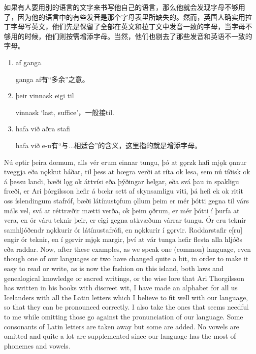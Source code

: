 \begin{translation*}{}
    如果有人要用别的语言的文字来书写他自己的语言，那么他就会发现字母不够用了，因为他的语言中的有些发音是那个字母表里所缺失的。然而，英国人确实用拉丁字母写英文，他们先是保留了全部在英文和拉丁文中发音一致的字母，当字母不够用的时候，他们则按需增添字母。当然，他们也剔去了那些发音和英语不一致的字母。
\end{translation*}
\begin{grammar*}{}
    \begin{enumerate}[leftmargin=*]
        \item af ganga

              ganga af有“多余”之意。

        \item þeir vinnask eigi til

              vinnask `last, suffice'，一般接til.

        \item hafa við aðra stafi

              hafa við e-u有“与...相适合”的含义，这里指的就是增添字母。
    \end{enumerate}
\end{grammar*}
\begin{paracol}{2}
    Nú eptir þeira dœmum, alls vér erum einnar tungu, þó at gǫrzk hafi mjǫk ǫnnur tveggja eða nǫkkut báðar, til þess at hœgra verði at ríta ok lesa, sem nú tíðisk ok á þessu landi, bæði lǫg ok áttvísi eða þýðingar helgar, eða svá þau in spakligu frœði, er Ari þórgilsson hefir á bœkr sett af skynsamligu viti, þá hefi ek ok ritit oss íslendingum stafróf, bæði látínustǫfum ǫllum þeim er mér þótti gegna til várs máls vel, svá at réttræðir mætti verða, ok þeim ǫðrum, er mér þótti í þurfa at vera, en ór váru teknir þeir, er eigi gegna atkvæðum várrar tungu. Ór eru teknir samhljóðendr nǫkkurir ór látínustafrófi, en nǫkkurir í gǫrvir. Raddarstafir e[ru] engir ór teknir, en í gǫrvir mjǫk margir, því at vár tunga hefir flesta alla hljóðs eða raddar.
    \switchcolumn
    Now, after these examples, as we speak one (common) language, even though one of our languages or two have changed quite a bit, in order to make it easy to read or write, as is now the fashion on this island, both laws and genealogical knowledge or sacred writings, or the wise lore that Ari Thorgilsson has written in his books with discreet wit, I have made an alphabet for all us Icelanders with all the Latin letters which I believe to fit well with our language, so that they can be pronounced correctly. I also take the ones that seems needful to me while omitting those go against the pronunciation of our language. Some consonants of Latin letters are taken away but some are added. No vowels are omitted and quite a lot are supplemented since our language has the most of phonemes and vowels.
\end{paracol}
